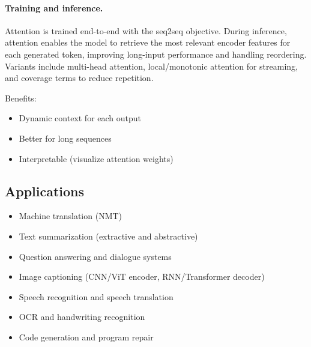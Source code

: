 \paragraph{Training and inference.} Attention is trained end-to-end with the seq2seq objective. During inference, attention enables the model to retrieve the most relevant encoder features for each generated token, improving long-input performance and handling reordering. Variants include multi-head attention, local/monotonic attention for streaming, and coverage terms to reduce repetition.

Benefits:
\begin{itemize}
    \item Dynamic context for each output
    \item Better for long sequences
    \item Interpretable (visualize attention weights)
\end{itemize}

\subsection{Applications}

\begin{itemize}
    \item Machine translation (NMT)
    \item Text summarization (extractive and abstractive)
    \item Question answering and dialogue systems
    \item Image captioning (CNN/ViT encoder, RNN/Transformer decoder)
    \item Speech recognition and speech translation
    \item OCR and handwriting recognition
    \item Code generation and program repair
\end{itemize}

